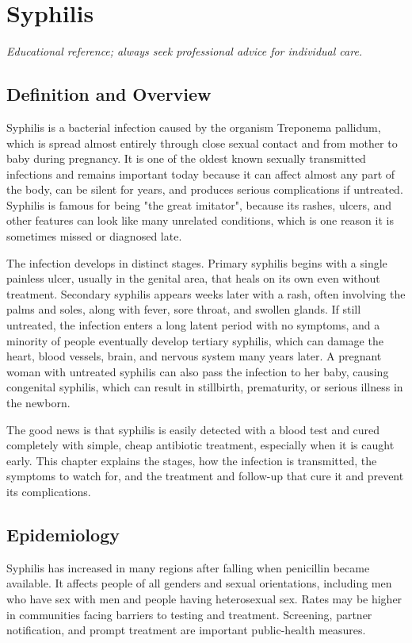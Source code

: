 \chapter{Syphilis}

\medskip
\noindent\textit{Educational reference; always seek professional advice for individual care.}

\section*{Definition and Overview}
Syphilis is a bacterial infection caused by the organism Treponema pallidum, which is spread almost entirely through close sexual contact and from mother to baby during pregnancy. It is one of the oldest known sexually transmitted infections and remains important today because it can affect almost any part of the body, can be silent for years, and produces serious complications if untreated. Syphilis is famous for being "the great imitator", because its rashes, ulcers, and other features can look like many unrelated conditions, which is one reason it is sometimes missed or diagnosed late.

The infection develops in distinct stages. Primary syphilis begins with a single painless ulcer, usually in the genital area, that heals on its own even without treatment. Secondary syphilis appears weeks later with a rash, often involving the palms and soles, along with fever, sore throat, and swollen glands. If still untreated, the infection enters a long latent period with no symptoms, and a minority of people eventually develop tertiary syphilis, which can damage the heart, blood vessels, brain, and nervous system many years later. A pregnant woman with untreated syphilis can also pass the infection to her baby, causing congenital syphilis, which can result in stillbirth, prematurity, or serious illness in the newborn.

The good news is that syphilis is easily detected with a blood test and cured completely with simple, cheap antibiotic treatment, especially when it is caught early. This chapter explains the stages, how the infection is transmitted, the symptoms to watch for, and the treatment and follow-up that cure it and prevent its complications.

\section*{Epidemiology}
Syphilis has increased in many regions after falling when penicillin became available. It affects people of all genders and sexual orientations, including men who have sex with men and people having heterosexual sex. Rates may be higher in communities facing barriers to testing and treatment. Screening, partner notification, and prompt treatment are important public-health measures.

